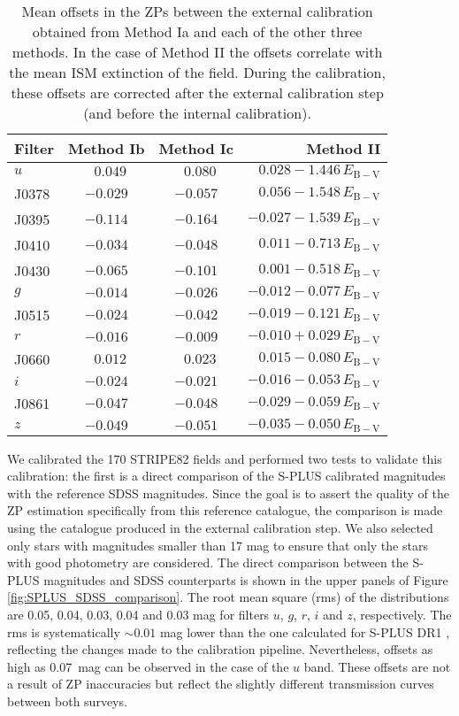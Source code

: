 \documentclass[fleqn,usenatbib]{mnras}
\begin{document}
\begin{table}
\caption{Mean offsets in the ZPs between the external calibration obtained from Method Ia and each of the other three methods. In the case of Method II the offsets correlate with the mean ISM extinction of the field. During the calibration, these offsets are corrected after the external calibration step (and before the internal calibration).}
\label{tab:offsets}
\centering
\begin{tabular}{lccr}
\hline \hline
Filter & Method Ib   & Method Ic   & Method II \\ \hline \hline
$u$      & $\;\;0.049$ & $\;\;0.080$ & $ 0.028 - 1.446\,E_\mathrm{B-V}$  \\
J0378   & $   -0.029$ & $   -0.057$ & $ 0.056 - 1.548\,E_\mathrm{B-V}$  \\
J0395   & $   -0.114$ & $   -0.164$ & $-0.027 - 1.539\,E_\mathrm{B-V}$  \\
J0410   & $   -0.034$ & $   -0.048$ & $ 0.011 - 0.713\,E_\mathrm{B-V}$  \\
J0430   & $   -0.065$ & $   -0.101$ & $ 0.001 - 0.518\,E_\mathrm{B-V}$  \\
$g$      & $   -0.014$ & $   -0.026$ & $-0.012 - 0.077\,E_\mathrm{B-V}$  \\
J0515   & $   -0.024$ & $   -0.042$ & $-0.019 - 0.121\,E_\mathrm{B-V}$  \\
$r$      & $   -0.016$ & $   -0.009$ & $-0.010 + 0.029\,E_\mathrm{B-V}$  \\
J0660   & $\;\;0.012$ & $\;\;0.023$ & $ 0.015 - 0.080\,E_\mathrm{B-V}$  \\
$i$      & $   -0.024$ & $   -0.021$ & $-0.016 - 0.053\,E_\mathrm{B-V}$  \\
J0861   & $   -0.047$ & $   -0.048$ & $-0.029 - 0.059\,E_\mathrm{B-V}$  \\
$z$      & $   -0.049$ & $   -0.051$ & $-0.035 - 0.050\,E_\mathrm{B-V}$  \\
\hline \hline
\end{tabular}
\end{table}


We calibrated the 170 STRIPE82 fields and performed two tests to validate this calibration: the first is a direct comparison of the S-PLUS calibrated magnitudes with the reference SDSS magnitudes. Since the goal is to assert the quality of the ZP estimation specifically from this reference catalogue, the comparison is made using the catalogue produced in the external calibration step. We also selected only stars with magnitudes smaller than 17 mag to ensure that only the stars with good photometry are considered. The direct comparison between the S-PLUS magnitudes and SDSS counterparts is shown in the upper panels of Figure \ref{fig:SPLUS_SDSS_comparison}. The root mean square (rms) of the distributions are 0.05, 0.04, 0.03, 0.04 and 0.03 mag for filters $u$, $g$, $r$, $i$ and $z$, respectively. The rms is systematically $\sim0.01$ mag lower than the one calculated for S-PLUS DR1 \citep{MendesDeOliveira+2019}, reflecting the changes made to the calibration pipeline. Nevertheless, offsets as high as 0.07~mag can be observed in the case of the $u$ band. These offsets are not a result of ZP inaccuracies but reflect the slightly different transmission curves between both surveys.
\end{document}
